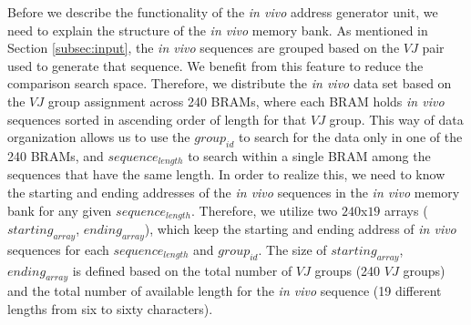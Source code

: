 Before we describe the functionality of the \emph{in vivo} address generator unit, we need to explain the structure of the \emph{in vivo} memory bank. As mentioned in Section \ref{subsec:input}, the \emph{in vivo} sequences are grouped based on the $VJ$ pair used to generate that sequence. We benefit from this feature to reduce the comparison search space. Therefore, we distribute the \emph{in vivo} data set based on the $VJ$ group assignment across 240 BRAMs, where each BRAM holds  \emph{in vivo} sequences sorted in ascending order of length for that $VJ$ group. This way of data organization allows us to use the $group_{id}$ to search for the data only in one of the 240 BRAMs, and $sequence_{length}$ to search within a single BRAM among the sequences that have the same length. In order to realize this, we need to know the starting and ending addresses of the \emph{in vivo} sequences in the \emph{in vivo} memory bank for any given $sequence_{length}$. Therefore, we utilize two $240$x$19$ arrays ($starting_{array}$, $ending_{array}$), which keep the starting and ending address of \emph{in vivo} sequences for each $sequence_{length}$ and $group_{id}$. The size of $starting_{array}$, $ending_{array}$ is defined based on the total number of $VJ$ groups (240 $VJ$ groups) and the total number of available length for the \emph{in vivo} sequence (19 different lengths from six to sixty characters).
%
%
%
